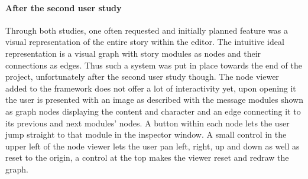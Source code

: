 \paragraph{After the second user study} Through both studies, one often requested and initially planned feature was a visual representation of the entire story within the editor. The intuitive ideal representation is a visual graph with story modules as nodes and their connections as edges. Thus such a system was put in place towards the end of the project, unfortunately after the second user study though. The node viewer added to the framework does not offer a lot of interactivity yet, upon opening it the user is presented with an image as described with the message modules shown as graph nodes displaying the content and character and an edge connecting it to its previous and next modules' nodes. A button within each node lets the user jump straight to that module in the inspector window. A small control in the upper left of the node viewer lets the user pan left, right, up and down as well as reset to the origin, a control at the top makes the viewer reset and redraw the graph.